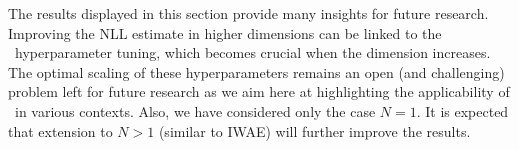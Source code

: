 \documentclass{article}
\begin{document}
The results displayed in this section provide many insights for future research. Improving the NLL estimate in higher dimensions  can be linked to the \InFiNE\ hyperparameter tuning, which becomes crucial when the dimension increases. The optimal scaling of these hyperparameters remains an open (and challenging) problem left for future research as we aim here at highlighting the applicability  of \InFiNE\ in various contexts.   %
Also, we have considered only the case $N=1$. It is expected that extension to $N > 1$ (similar to IWAE) will further improve the results.
\clearpage




\end{document}
